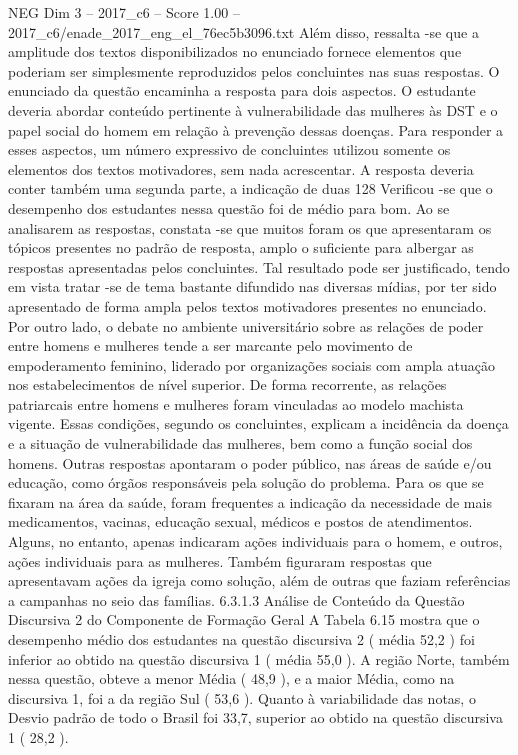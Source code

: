 \begin{textsample}{NEG Dim 3 – 2017\_c6 – Score 1.00 – 2017\_c6/enade\_2017\_eng\_el\_76ec5b3096.txt}
Além disso, ressalta -se que a amplitude dos textos disponibilizados no enunciado fornece elementos que poderiam ser simplesmente reproduzidos pelos concluintes nas suas respostas.
O enunciado da questão encaminha a resposta para dois aspectos.
O estudante deveria abordar conteúdo pertinente à vulnerabilidade das mulheres às DST e o papel social do homem em relação à prevenção dessas doenças.
Para responder a esses aspectos, um número expressivo de concluintes utilizou somente os elementos dos textos motivadores, sem nada acrescentar.
A resposta deveria conter também uma segunda parte, a indicação de duas 128 Verificou -se que o desempenho dos estudantes nessa questão foi de médio para bom.
Ao se analisarem as respostas, constata -se que muitos foram os que apresentaram os tópicos presentes no padrão de resposta, amplo o suficiente para albergar as respostas apresentadas pelos concluintes.
Tal resultado pode ser justificado, tendo em vista tratar -se de tema bastante difundido nas diversas mídias, por ter sido apresentado de forma ampla pelos textos motivadores presentes no enunciado.
Por outro lado, o debate no ambiente universitário sobre as relações de poder entre homens e mulheres tende a ser marcante pelo movimento de empoderamento feminino, liderado por organizações sociais com ampla atuação nos estabelecimentos de nível superior.
De forma recorrente, as relações patriarcais entre homens e mulheres foram vinculadas ao modelo machista vigente.
Essas condições, segundo os concluintes, explicam a incidência da doença e a situação de vulnerabilidade das mulheres, bem como a função social dos homens.
Outras respostas apontaram o poder público, nas áreas de saúde e/ou educação, como órgãos responsáveis pela solução do problema.
Para os que se fixaram na área da saúde, foram frequentes a indicação da necessidade de mais medicamentos, vacinas, educação sexual, médicos e postos de atendimentos.
Alguns, no entanto, apenas indicaram ações individuais para o homem, e outros, ações individuais para as mulheres.
Também figuraram respostas que apresentavam ações da igreja como solução, além de outras que faziam referências a campanhas no seio das famílias. 6.3.1.3 Análise de Conteúdo da Questão Discursiva 2 do Componente de Formação Geral A Tabela 6.15 mostra que o desempenho médio dos estudantes na questão discursiva 2 ( média 52,2 ) foi inferior ao obtido na questão discursiva 1 ( média 55,0 ).
A região Norte, também nessa questão, obteve a menor Média ( 48,9 ), e a maior Média, como na discursiva 1, foi a da região Sul ( 53,6 ).
Quanto à variabilidade das notas, o Desvio padrão de todo o Brasil foi 33,7, superior ao obtido na questão discursiva 1 ( 28,2 ).

\end{textsample}

